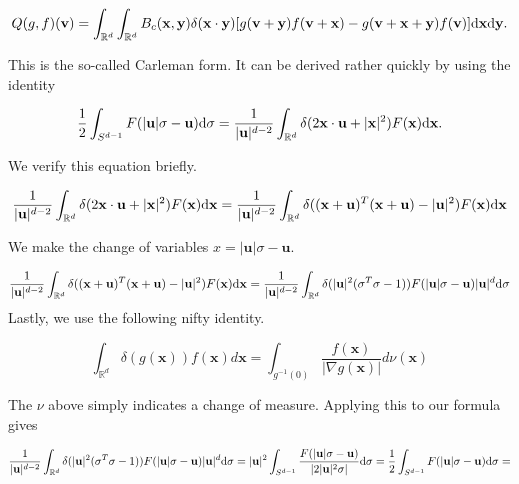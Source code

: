 \documentclass{article}
\def\b{\mathbf}
\def\t{\text}
\begin{document}
\begin{equation*} \label{eq:Carleman}
    Q(g,f)(\b v) = \int_{\mathbb{R}^d} \int_{\mathbb{R}^d} B_c(\b x, \b y) \delta( \b x \cdot \b y)[g(\b v + \b y) f(\b v + \b x) - g(\b v + \b x + \b y) f(\b v)] \t d \b x \t d \b y.
\end{equation*}

This is the so-called Carleman form. It can be derived rather quickly by using the identity

\[\frac{1}{2} \int_{S^{d-1}} F(| \b u| \sigma - \b u) \t d \sigma = \frac{1}{| \b u |^{d-2}} \int_{\mathbb{R}^d}\delta(2 \b x \cdot \b u + | \b x |^2) F(\b x) \t d \b x.
\]

We verify this equation briefly.

\begin{gather*}
    \frac{1}{| \b u |^{d-2}} \int_{\mathbb{R}^d} \delta(2 \b x \cdot \b u + | \b x |^2) F(\b x) \t d \b x = \frac{1}{| \b u |^{d-2}} \int_{\mathbb{R}^d} \delta((\b x + \b u)^T(\b x + \b u) - | \b u |^2) F(\b x) \t d \b x 
\end{gather*}

We make the change of variables $x = | \b u | \sigma - \b u$.

\begin{gather*}
    \frac{1}{| \b u |^{d-2}} \int_{\mathbb{R}^d} \delta((\b x + \b u)^T(\b x + \b u) - | \b u |^2) F(\b x) \t d \b x =
    \frac{1}{| \b u |^{d-2}} \int_{\mathbb{R}^d} \delta(|\b u |^2 (\sigma ^T \sigma - 1)) F(| \b u | \sigma - \b u) | \b u | ^ d \t d \b \sigma
\end{gather*}
Lastly, we use the following nifty identity.

\[
    \int_{\mathbb{R}^d} \delta(g(\b x)) f(\b x) d \b x = \int_{g^{-1}(0)} \frac{f(\b x)}{| \nabla g( \b x) |} d \nu(\b x)
\]

The $\nu$ above simply indicates a change of measure. Applying this to our formula gives 

\begin{gather*}
    \frac{1}{| \b u |^{d-2}} \int_{\mathbb{R}^d} \delta(|\b u |^2 (\sigma ^T \sigma - 1)) F(| \b u | \sigma - \b u) | \b u | ^ d \t d \b \sigma = 
    | \b u | ^ 2 \int_{S^{d-1}} \frac{F(| \b u | \sigma - \b u)}{|2 | \b u |^2 \sigma |} \t d \b \sigma = 
    \frac{1}{2} \int_{S^{d-1}} F(| \b u | \sigma - \b u) \t d \b \sigma = 
\end{gather*}
\end{document}
